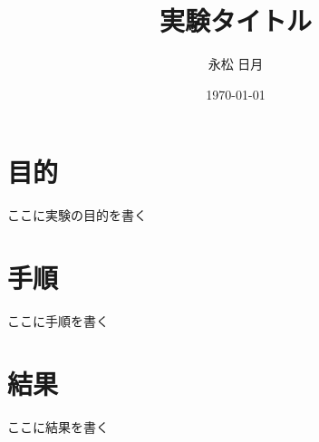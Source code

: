 \documentclass[a4paper,12pt]{article}
\title{実験タイトル}
\author{永松 日月}
\date{\today}
\begin{document}
\maketitle

\section*{目的}
ここに実験の目的を書く

\section*{手順}
ここに手順を書く

\section*{結果}
ここに結果を書く




\end{document}
